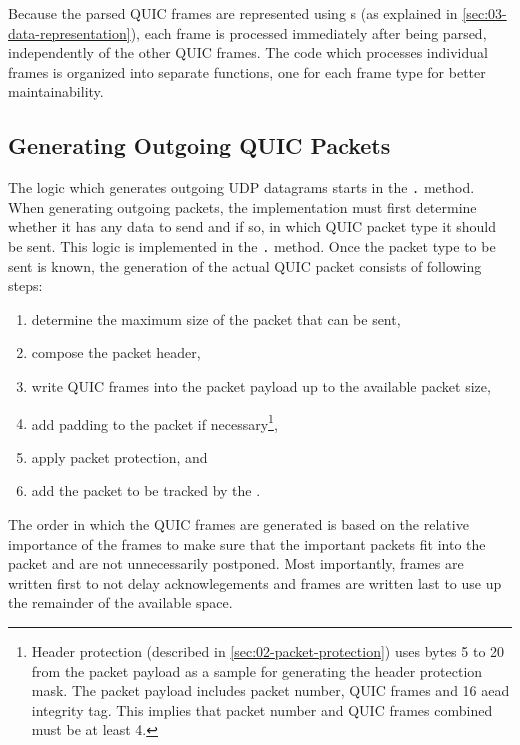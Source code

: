 Because the parsed QUIC frames are represented using s (as explained in
\autoref{sec:03-data-representation}), each frame is processed immediately after being parsed,
independently of the other QUIC frames. The code which processes individual frames is organized
into separate functions, one for each frame type for better maintainability.

\subsection{Generating Outgoing QUIC Packets}

The logic which generates outgoing UDP datagrams starts in the
\texttt{\ManagedQuicConnection{}.} method. When generating outgoing packets, the
implementation must first determine whether it has any data to send and if so, in which QUIC packet
type it should be sent. This logic is implemented in the
\texttt{\ManagedQuicConnection{}.} method. Once the packet type to be sent is
known, the generation of the actual QUIC packet consists of following steps:

\begin{enumerate}

  \item determine the maximum size of the packet that can be sent,

  \item compose the packet header,

  \item write QUIC frames into the packet payload up to the available packet size,

  \item add padding to the packet if necessary\footnote{Header protection (described in \autoref{sec:02-packet-protection}) uses bytes 5 to 20 from the packet payload as a sample for generating the header protection mask. The packet payload includes packet number, QUIC frames and \SI{16}{\byte} \gls{aead} integrity tag. This implies that packet number and QUIC frames combined must be at least \SI{4}{\byte}.},

  \item apply packet protection, and

  \item add the packet to be tracked by the \RecoveryController{}.

\end{enumerate}

The order in which the QUIC frames are generated is based on the relative importance of the frames
to make sure that the important packets fit into the packet and are not unnecessarily postponed.
Most importantly, \ACK{} frames are written first to not delay acknowlegements and \STREAM{} frames
are written last to use up the remainder of the available space.

